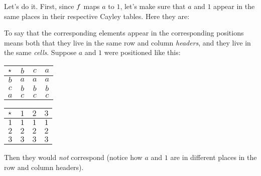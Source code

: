 \documentclass[../../../main.tex]{subfiles}
\begin{document}
\begin{fexample}
Let's do it. First, since $f$ maps $a$ to $1$, let's make sure that $a$ and $1$ appear in the same places in their respective Cayley tables. Here they are:

\begin{aside}
  \begin{remark}
    To say that the corresponding elements appear in the corresponding positions means both that they live in the same row and column \emph{headers}, and they live in the same \emph{cells}. Suppose $a$ and $1$ were positioned like this:
    
\begin{center}
  \begin{tabular}{| c || c | c | c | }
    \hline
    $\opSymbol/$ & $b$ & $c$ & \cellcolor{grey3} $a$  \\ \hline \hline
    $b$          & \cellcolor{grey3}$a$ & \cellcolor{grey3}$a$ & \cellcolor{grey3}$a$ \\ \hline
    $c$          & $b$ & $b$ & $b$ \\ \hline
    \cellcolor{grey3}$a$          & $c$ & $c$ & $c$ \\ \hline
  \end{tabular}
\end{center}
\begin{center}
  \begin{tabular}{| c || c | c | c | }
    \hline
    $\opSymbol/$ & \cellcolor{grey3} $1$ & $2$ & $3$ \\ \hline \hline
    \cellcolor{grey3}$1$          & \cellcolor{grey3}$1$ & \cellcolor{grey3}$1$ & \cellcolor{grey3}$1$ \\ \hline
    $2$          & $2$ & $2$ & $2$ \\ \hline
    $3$          & $3$ & $3$ & $3$ \\ \hline
  \end{tabular}
\end{center}

  Then they would \emph{not} correspond (notice how $a$ and $1$ are in different places in the row and column headers).
    
  \end{remark}
\end{aside}


\end{fexample}
\end{document}
